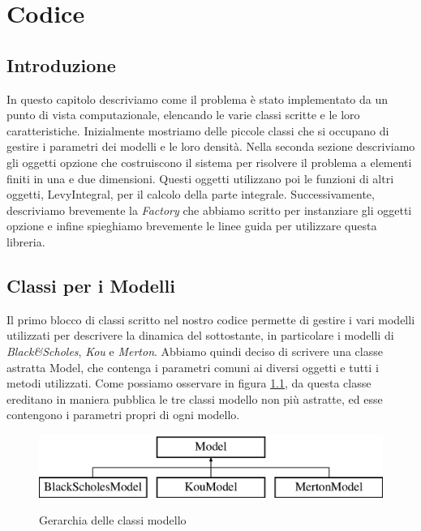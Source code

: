 \documentclass[a4paper,10pt]{report}
\theoremstyle{plain}
\theoremstyle{definition}
\theoremstyle{remark}
\begin{document}
\chapter{Codice}
\section{Introduzione}
In questo capitolo descriviamo come il problema \`e stato implementato da un punto di vista computazionale, elencando le varie classi scritte e le loro caratteristiche. Inizialmente mostriamo delle piccole classi che si occupano di gestire i parametri dei modelli e le loro densit\`a. Nella seconda sezione descriviamo gli oggetti opzione che costruiscono il sistema per risolvere il problema a elementi finiti in una e due dimensioni. Questi oggetti utilizzano poi le funzioni di altri oggetti, \textsf{LevyIntegral}, per il calcolo della parte integrale. Successivamente, descriviamo brevemente la \emph{Factory} che abbiamo scritto per instanziare gli oggetti opzione e infine spieghiamo brevemente le linee guida per utilizzare questa libreria.
\section{Classi per i Modelli}
Il primo blocco di classi scritto nel nostro codice permette di gestire i vari modelli utilizzati per descrivere la dinamica del sottostante, in particolare i modelli di \emph{Black\&Scholes}, \emph{Kou} e \emph{Merton}. Abbiamo quindi deciso di scrivere una classe astratta \textsf{Model}, che contenga i parametri comuni ai diversi oggetti e tutti i metodi utilizzati. Come possiamo osservare in figura \ref{modelbase}, da questa classe ereditano in maniera pubblica le tre classi modello non pi\`u astratte, ed esse contengono i parametri propri di ogni modello.
\begin{figure}[h!]
\begin{center}
\includegraphics[width=12cm]{img/classModel.eps}
\label{modelbase}
\caption{Gerarchia delle classi modello}
\end{center}
\end{figure}
\end{document}
